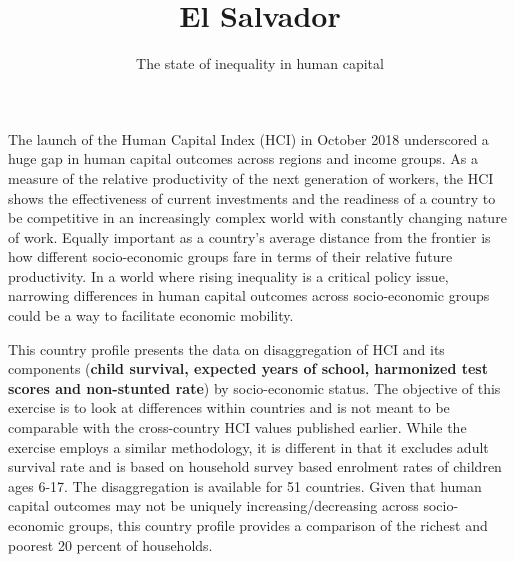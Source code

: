 \documentclass[8pt,]{article}
\title{El Salvador}
\author{The state of inequality in human capital}
\date{}
\begin{document}
\maketitle

\newcommand\boldblue[1]{\textcolor{bondiblue}{\textbf{#1}}}

The launch of the Human Capital Index (HCI) in October 2018 underscored
a huge gap in human capital outcomes across regions and income groups.
As a measure of the relative productivity of the next generation of
workers, the HCI shows the effectiveness of current investments and the
readiness of a country to be competitive in an increasingly complex
world with constantly changing nature of work. Equally important as a
country's average distance from the frontier is how different
socio-economic groups fare in terms of their relative future
productivity. In a world where rising inequality is a critical policy
issue, narrowing differences in human capital outcomes across
socio-economic groups could be a way to facilitate economic mobility.

This country profile presents the data on disaggregation of HCI and its
components (\textbf{child survival, expected years of school, harmonized
test scores and non-stunted rate}) by socio-economic status. The
objective of this exercise is to look at differences within countries
and is not meant to be comparable with the cross-country HCI values
published earlier. While the exercise employs a similar methodology, it
is different in that it excludes adult survival rate and is based on
household survey based enrolment rates of children ages 6-17. The
disaggregation is available for 51 countries. Given that human capital
outcomes may not be uniquely increasing/decreasing across socio-economic
groups, this country profile provides a comparison of the richest and
poorest 20 percent of households.
\end{document}

